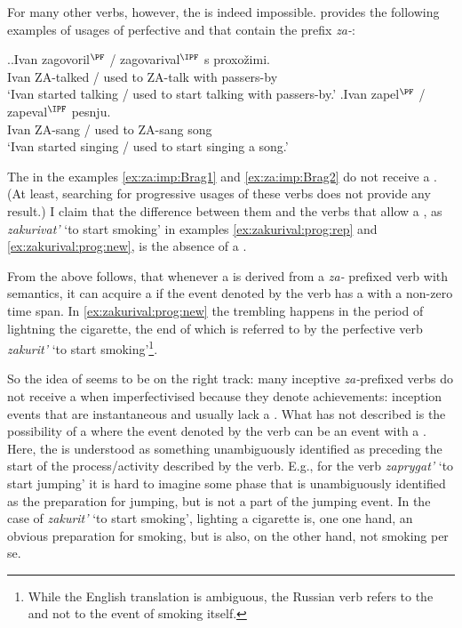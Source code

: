 For many other verbs, however, the  is indeed impossible. \citet{Braginsky:08} provides the following examples of usages of perfective and  that contain the  prefix \textit{za-}:

\ex.\label{ex:za:imp:Brag}\ag.\label{ex:za:imp:Brag1}Ivan zagovoril$^{\PF}$ / zagovarival$^{\IPF}$ s proxo\v{z}imi.\\
Ivan ZA-talked / {used to ZA-talk} with passers-by\\
\trans `Ivan started talking / used to start talking with passers-by.'
\bg.\label{ex:za:imp:Brag2}Ivan zapel$^{\PF}$ / zapeval$^{\IPF}$ pesnju.\\
Ivan ZA-sang / {used to ZA-sang} song\\
\trans `Ivan started singing / used to start singing a song.'\\

The  in the examples \ref{ex:za:imp:Brag1} and \ref{ex:za:imp:Brag2} do not receive a . (At least, searching for progressive usages of these verbs does not provide any result.) I claim that the difference between them and the verbs that allow a , as \textit{zakurivat'} `to start smoking' in examples \ref{ex:zakurival:prog:rep} and \ref{ex:zakurival:prog:new}, is the absence of a . 

From the above follows, that whenever a  is derived from a \textit{za-} prefixed verb with  semantics, it can acquire a  if the event denoted by the verb has a  with a non-zero time span. In \ref{ex:zakurival:prog:new} the trembling happens in the period of lightning the cigarette, the end of which is referred to by the perfective verb \textit{zakurit'} `to start smoking'\footnote{While the English translation is ambiguous, the Russian verb refers to the  and not to the event of smoking itself.}. 

So the idea of \citet{Braginsky:08} seems to be on the right track: many inceptive \textit{za-}prefixed verbs do not receive a  when imperfectivised because they denote achievements: inception events that are instantaneous and usually lack a . What \citet{Braginsky:08} has not described is the possibility of a  where the event denoted by the verb can be  an event with a . Here, the  is understood as something unambiguously identified as preceding the start of the process/activity described by the  verb. E.g., for the verb \textit{zaprygat'} `to start jumping' it is hard to imagine some phase that is unambiguously identified as the preparation for jumping, but is not a part of the jumping event. In the case of \textit{zakurit'} `to start smoking', lighting a cigarette is, one one hand, an obvious preparation for smoking, but is also, on the other hand, not smoking per se. 

